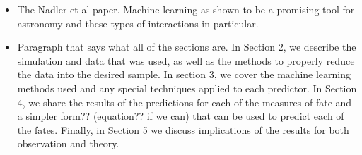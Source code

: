 \documentclass[fleqn,usenatbib]{mnras}
\begin{document}
\begin{itemize}
    \item The Nadler et al paper. Machine learning as shown to be a promising tool for astronomy and these types of interactions in particular.
  \item Paragraph that says what all of the sections are. In Section 2, we describe the simulation and data that was used, as well as the methods to properly reduce the data into the desired sample. In section 3, we cover the machine learning methods used and any special techniques applied to each predictor. In Section 4, we share the results of the predictions for each of the measures of fate and a simpler form?? (equation?? if we can) that can be used to predict each of the fates. Finally, in Section 5 we discuss implications of the results for both observation and theory.
\end{itemize}
\end{document}
